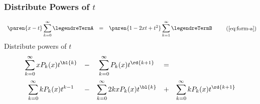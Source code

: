 %

\begin{frame}\frametitle{Distribute Powers of $t$}
\begin{equation}
	\begin{array}{rcl}
		\displaystyle\paren{x-t}\sum_{k=0}^{\infty}\legendreTermA &=& \paren{1 - 2xt + t^{2}}\displaystyle\sum_{k=1}^{\infty}{\legendreTermB}
	\end{array}
\tag{\ref{eq:form-a}}
\end{equation}
Distribute powers of $t$
\pause
\begin{equation}
	\begin{array}{ccccc c}
		\displaystyle\sum_{k=0}^{\infty}{xP_{k}(x)t^{\bl{k}}} 
			&-&
		\displaystyle\sum_{k=0}^{\infty}{P_{k}(x)t^{\rd{k+1}}} 
			&=& \\[15pt]
		\displaystyle\sum_{k=0}^{\infty}{k P_{k}(x)t^{k-1}}
			&-&
		\displaystyle\sum_{k=0}^{\infty}{2kx P_{k}(x)t^{\bl{k}}}
			&+&
		\displaystyle\sum_{k=0}^{\infty}{k P_{k}(x)t^{\rd{k+1}}}
	\end{array}
\label{eq:same-damn-thing}
\end{equation}	
\end{frame}

